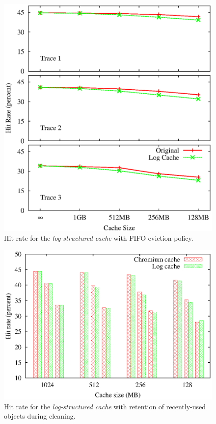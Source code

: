 \documentclass[letterpaper,twocolumn,10pt]{article}
\begin{document}
\begin{figure}[t]
  \begin{center}
    \includegraphics[width=1.04\columnwidth]{graphs/hit-rate-2}
  \end{center}
  \caption{Hit rate for the \emph{log-structured cache} with FIFO eviction
    policy.}
  \label{fig:hit-rate} 
\vspace{-0.2in}
\end{figure}

\begin{figure}
\centering
\includegraphics[width=1.05\columnwidth]{graphs/hit-rate}
\caption{Hit rate for the \emph{log-structured cache} with retention
  of recently-used objects during cleaning.}
\label{fig:hit-rate2}
\end{figure}
\end{document}
